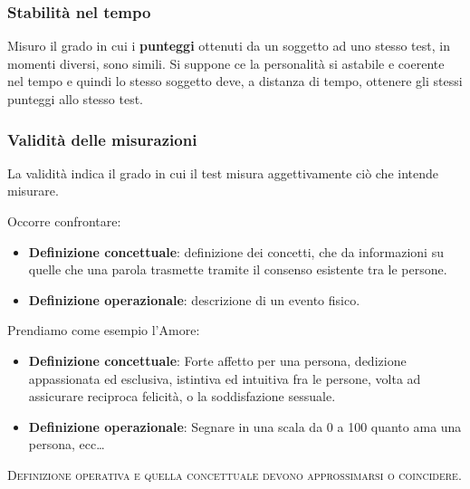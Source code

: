 \documentclass{subfiles}
\begin{document}
    \subsubsection*{Stabilità nel tempo}
        Misuro il grado in cui i \textbf{punteggi} ottenuti da un soggetto ad uno stesso test, in 
        momenti diversi, sono simili. 
        Si suppone ce la personalità si astabile e coerente nel tempo e quindi lo stesso soggetto 
        deve, a distanza di tempo, ottenere gli stessi punteggi allo stesso test.

    \subsubsection*{Validità delle misurazioni}
        La validità indica il grado in cui il test misura aggettivamente ciò che intende misurare.

        Occorre confrontare:
        \begin{itemize}
            \item \textbf{Definizione concettuale}: definizione dei concetti, che da informazioni su 
            quelle che una parola trasmette tramite il consenso esistente tra le persone.
            \item \textbf{Definizione operazionale}: descrizione di un evento fisico. 
        \end{itemize}

        Prendiamo come esempio l'Amore:
        \begin{itemize}
            \item \textbf{Definizione concettuale}: Forte affetto per una persona, dedizione 
            appassionata ed esclusiva, istintiva ed intuitiva fra le persone, volta ad assicurare 
            reciproca felicità, o la soddisfazione sessuale.
            \item \textbf{Definizione operazionale}: Segnare in una scala da 0 a 100 quanto ama una 
            persona, ecc\ldots 
        \end{itemize}

        \textsc{Definizione operativa e quella concettuale devono approssimarsi o coincidere.}
\end{document}
